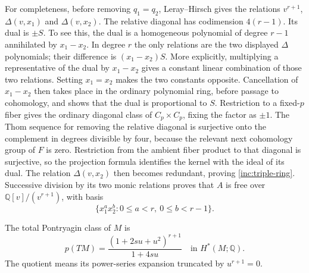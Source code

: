 For completeness, before removing $q_1=q_2$, Leray--Hirsch gives
the relations $v^{r+1}$, $\Delta(v,x_1)$ and $\Delta(v,x_2)$.
The relative diagonal has codimension $4(r-1)$. Its dual is
$\pm S$. To see this, the dual is a homogeneous polynomial of
degree $r-1$ annihilated by $x_1-x_2$. In degree $r$ the only
relations are the two displayed $\Delta$ polynomials; their
difference is $(x_1-x_2)S$. More explicitly, multiplying a
representative of the dual by $x_1-x_2$ gives a constant linear
combination of those two relations. Setting $x_1=x_2$ makes
the two constants opposite. Cancellation of $x_1-x_2$ then
takes place in the ordinary polynomial ring, before passage
to cohomology, and shows that the dual is proportional to $S$.
Restriction to a fixed-$p$ fiber gives the ordinary diagonal
class of $C_p\times C_p$, fixing the factor as $\pm1$.
The Thom sequence for removing the relative diagonal is
surjective onto the complement in degrees divisible by four,
because the relevant next cohomology group of $F$ is zero.
Restriction from the ambient fiber product to that diagonal is
surjective, so the projection formula identifies the kernel
with the ideal of its dual. The relation $\Delta(v,x_2)$ then
becomes redundant, proving \eqref{inc:triple-ring}.
Successive division by its two monic relations proves that $A$
is free over $\mathbb Q[v]/(v^{r+1})$, with basis
\begin{equation}\label{inc:free-basis}
 \{x_1^a x_2^b:0\le a<r,\ 0\le b<r-1\}.
\end{equation}

\begin{theorem}\label{inc:pontryagin}
The total Pontryagin class of $M$ is
\begin{equation}\label{inc:pontryagin-formula}
 p(TM)=\frac{(1+2su+u^2)^{r+1}}{1+4su}
 \quad\text{in }H^*(M;\mathbb Q).
\end{equation}
The quotient means its power-series expansion truncated by
$u^{r+1}=0$.
\end{theorem}

